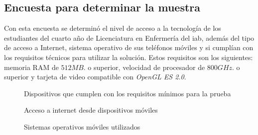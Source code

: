 \subsection{Encuesta para determinar la muestra}
\label{encuesta_muestra}

Con esta encuesta se determinó el nivel de acceso a la tecnología de los
estudiantes del cuarto año de Licenciatura en Enfermería del \gls{iab}, además
del tipo de acceso a Internet, sistema operativo de sus teléfonos móviles y si
cumplían con los requisitos técnicos para utilizar la solución. Estos requisitos
son los siguientes:  memoria RAM de $512MB.$ o superior, velocidad de procesador
de $800 GHz.$ o superior y tarjeta de video compatible con \emph{OpenGL ES 2.0}. 

\begin{figure}[H]
\centering
{}
\caption{Dispositivos que cumplen con los requisitos mínimos para la prueba}
\label{fig:ubicacion_requisitos_minimos}
\end{figure}

\begin{figure}[H]
\centering
{}
\caption{Acceso a internet desde dispositivos móviles}
\label{fig:ubicacion_acceso_internet}
\end{figure}

\begin{figure}[H]
\centering
{}
\caption{Sistemas operativos móviles utilizados}
\label{fig:ubicacion_sistemas_operativos}
\end{figure}

